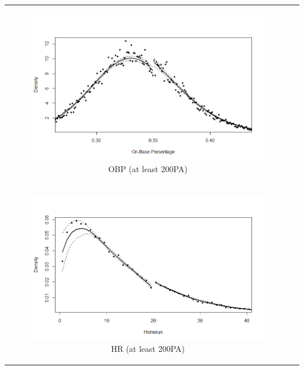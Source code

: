 \documentclass[dvipdfmx, 12pt]{article}
\begin{document}
\begin{tabular}{cc}
\begin{minipage}[H]{0.4\textwidth}
    \begin{figure}[H]
      \centering
      \includegraphics[keepaspectratio, scale = 0.5, angle = 90]
      {graphs/OBP_350.png}
      \caption{OBP (at least 200PA)}
      \label{OBP_350}
      \end{figure}
   \end{minipage} \\
   \begin{minipage}[H]{0.4\textwidth}
    \begin{figure}[H]
      \centering
      \includegraphics[keepaspectratio, scale = 0.5, angle = 90]
      {graphs/HR_20.png}
      \caption{HR (at least 200PA)}
      \label{HR_20}
    \end{figure}
   \end{minipage}  &

   \begin{minipage}[H]{0.4\textwidth}


\end{minipage}
\end{tabular}
\end{document}
